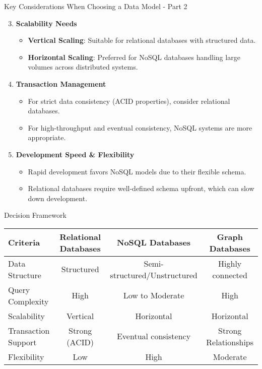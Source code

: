\documentclass[aspectratio=169]{beamer}
\begin{document}
\begin{frame}[fragile]{Key Considerations When Choosing a Data Model - Part 2}
    \begin{enumerate}
        \setcounter{enumi}{2}
        \item \textbf{Scalability Needs}
            \begin{itemize}
                \item \textbf{Vertical Scaling}: Suitable for relational databases with structured data.
                \item \textbf{Horizontal Scaling}: Preferred for NoSQL databases handling large volumes across distributed systems.
            \end{itemize}
        \item \textbf{Transaction Management}
            \begin{itemize}
                \item For strict data consistency (ACID properties), consider relational databases.
                \item For high-throughput and eventual consistency, NoSQL systems are more appropriate.
            \end{itemize}
        \item \textbf{Development Speed \& Flexibility}
            \begin{itemize}
                \item Rapid development favors NoSQL models due to their flexible schema.
                \item Relational databases require well-defined schema upfront, which can slow down development.
            \end{itemize}
    \end{enumerate}
\end{frame}

\begin{frame}[fragile]{Decision Framework}
    \begin{table}[ht]
        \centering
        \begin{tabular}{|l|c|c|c|}
            \hline
            \textbf{Criteria} & \textbf{Relational Databases} & \textbf{NoSQL Databases} & \textbf{Graph Databases} \\ \hline
            Data Structure & Structured & Semi-structured/Unstructured & Highly connected \\ \hline
            Query Complexity & High & Low to Moderate & High \\ \hline
            Scalability & Vertical & Horizontal & Horizontal \\ \hline
            Transaction Support & Strong (ACID) & Eventual consistency & Strong Relationships \\ \hline
            Flexibility & Low & High & Moderate \\ \hline
        \end{tabular}
    \end{table}
\end{frame}
\end{document}
